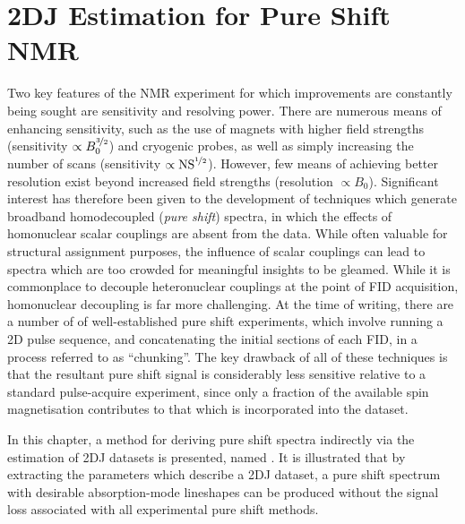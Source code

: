 \chapter{2DJ Estimation for Pure Shift NMR}
\label{chap:cupid}
Two key features of the \ac{NMR} experiment for which improvements are
constantly being sought are sensitivity and resolving power. There are numerous
means of enhancing sensitivity, such as the use of magnets with higher field
strengths\cite{Maeda2019} (sensitivity $\propto B_0^{\nicefrac{3}{2}}$) and
cryogenic probes\cite{Kovacs2020}, as well as simply
increasing the number of scans (sensitivity $\propto
\operatorname{NS}^{\nicefrac{1}{2}}$).
However, few means of achieving better resolution exist beyond increased field
strengths (resolution $\propto B_0$). Significant interest has therefore been
given to the development of techniques which generate broadband homodecoupled
(\emph{pure shift}) spectra, in which the effects of homonuclear scalar
couplings are absent from the data. While often valuable for structural
assignment purposes, the influence of scalar couplings can lead to spectra
which are too crowded for meaningful insights to be gleamed. While it is
commonplace to decouple heteronuclear couplings at the point of \ac{FID}
acquisition\cite{Shaka1983a, Shaka1983b,Shaka1985}, homonuclear decoupling is
far more challenging. At the time of writing, there are a number of of
well-established pure shift experiments, which involve running a \ac{2D} pulse
sequence, and concatenating the initial sections of each \ac{FID}, in a process
referred to as ``chunking''\cite{Meyer2013,Adams2014,Zangger2015}. The key
drawback of all of these techniques is that the resultant pure shift signal is
considerably less sensitive relative to a standard pulse-acquire experiment,
since only a fraction of the available spin magnetisation contributes to that
which is incorporated into the dataset.

In this chapter, a method for deriving pure shift spectra indirectly via the
estimation of \ac{2DJ} datasets is presented, named . It is
illustrated that by extracting the parameters which describe a \ac{2DJ}
dataset, a pure shift spectrum with desirable absorption-mode lineshapes can be
produced without the signal loss associated with all experimental pure shift
methods.





